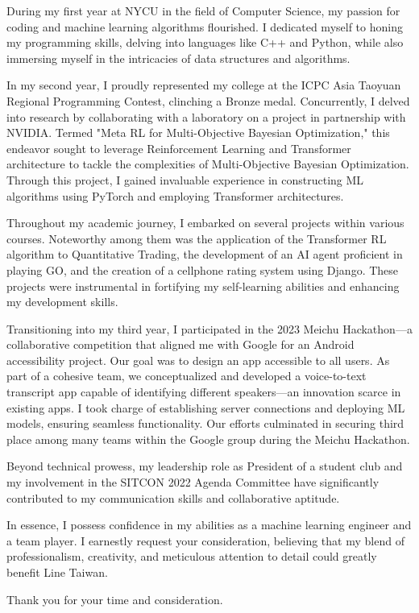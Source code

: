 \begin{cvletter}

During my first year at NYCU in the field of Computer Science, my passion for coding and machine learning algorithms flourished. I dedicated myself to honing my programming skills, delving into languages like C++ and Python, while also immersing myself in the intricacies of data structures and algorithms.

In my second year, I proudly represented my college at the ICPC Asia Taoyuan Regional Programming Contest, clinching a Bronze medal. Concurrently, I delved into research by collaborating with a laboratory on a project in partnership with NVIDIA. Termed "Meta RL for Multi-Objective Bayesian Optimization," this endeavor sought to leverage Reinforcement Learning and Transformer architecture to tackle the complexities of Multi-Objective Bayesian Optimization. Through this project, I gained invaluable experience in constructing ML algorithms using PyTorch and employing Transformer architectures.

Throughout my academic journey, I embarked on several projects within various courses. Noteworthy among them was the application of the Transformer RL algorithm to Quantitative Trading, the development of an AI agent proficient in playing GO, and the creation of a cellphone rating system using Django. These projects were instrumental in fortifying my self-learning abilities and enhancing my development skills.

Transitioning into my third year, I participated in the 2023 Meichu Hackathon—a collaborative competition that aligned me with Google for an Android accessibility project. Our goal was to design an app accessible to all users. As part of a cohesive team, we conceptualized and developed a voice-to-text transcript app capable of identifying different speakers—an innovation scarce in existing apps. I took charge of establishing server connections and deploying ML models, ensuring seamless functionality. Our efforts culminated in securing third place among many teams within the Google group during the Meichu Hackathon.

Beyond technical prowess, my leadership role as President of a student club and my involvement in the SITCON 2022 Agenda Committee have significantly contributed to my communication skills and collaborative aptitude.

In essence, I possess confidence in my abilities as a machine learning engineer and a team player. I earnestly request your consideration, believing that my blend of professionalism, creativity, and meticulous attention to detail could greatly benefit Line Taiwan.

Thank you for your time and consideration.

\end{cvletter}


